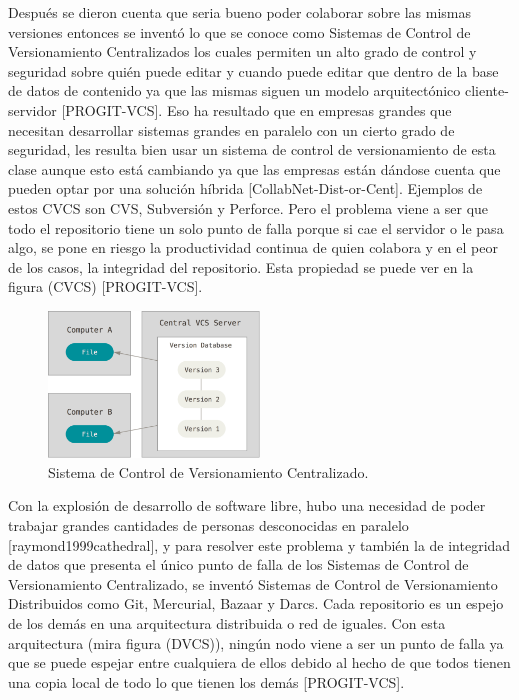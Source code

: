 Después se dieron cuenta que seria bueno poder colaborar sobre las mismas versiones entonces se inventó lo que se conoce como Sistemas de Control de Versionamiento Centralizados los cuales permiten un alto grado de control y seguridad sobre quién puede editar y cuando puede editar que dentro de la base de datos de contenido ya que las mismas siguen un modelo arquitectónico cliente-servidor [PROGIT-VCS]. Eso ha resultado que en empresas grandes que necesitan desarrollar sistemas grandes en paralelo con un cierto grado de seguridad, les resulta bien usar un sistema de control de versionamiento de esta clase aunque esto está cambiando ya que las empresas están dándose cuenta que pueden optar por una solución híbrida [CollabNet-Dist-or-Cent]. Ejemplos de estos CVCS son CVS, Subversión y Perforce. Pero el problema viene a ser que todo el repositorio tiene un solo punto de falla porque si cae el servidor o le pasa algo, se pone en riesgo la productividad continua de quien colabora y en el peor de los casos, la integridad del repositorio. Esta propiedad se puede ver en la figura (CVCS) [PROGIT-VCS].

\begin{figure}
  \begin{center}
  	\includegraphics[width=0.5\textwidth]{Figures/cvcs.png}
  \end{center}
  \caption{Sistema de Control de Versionamiento Centralizado.} 
  \label{CVCS}
\end{figure}

Con la explosión de desarrollo de software libre, hubo una necesidad de poder trabajar grandes cantidades de personas desconocidas en paralelo [raymond1999cathedral], y para resolver este problema y también la de integridad de datos que presenta el único punto de falla de los Sistemas de Control de Versionamiento Centralizado, se inventó Sistemas de Control de Versionamiento Distribuidos como Git, Mercurial, Bazaar y Darcs. Cada repositorio es un espejo de los demás en una arquitectura distribuida o red de iguales. Con esta arquitectura (mira figura (DVCS)), ningún nodo viene a ser un punto de falla ya que se puede espejar entre cualquiera de ellos debido al hecho de que todos tienen una copia local de todo lo que tienen los demás [PROGIT-VCS].

